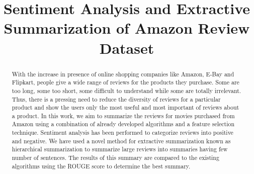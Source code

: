 \documentclass[conference]{IEEEtran}
\begin{document}
\title{Sentiment Analysis and Extractive Summarization of Amazon Review Dataset\\
{\footnotesize}
}

\author{
\and
{}
\and
{}
\and
{}
\and
{}
\and
{}
}


\maketitle

\begin{abstract}
With the increase in presence of online shopping companies like Amazon, E-Bay and
Flipkart, people give a wide range of reviews for the products they purchase. Some are too
long, some too short, some difficult to understand while some are totally irrelevant. Thus,
there is a pressing need to reduce the diversity of reviews for a particular product and show
the users only the most useful and most important of reviews about a product. In this work,
we aim to summarize the reviews for movies purchased from Amazon using a combination
of already developed algorithms and a feature selection technique. Sentiment analysis has been
performed to categorize reviews into positive and negative. We have used a novel method for extractive
summarization known as hierarchical summarization to summarize large reviews into summaries having
few number of sentences. The results of this summary are compared to the existing algorithms
using the ROUGE score to determine the best summary.
\end{abstract}
\end{document}
